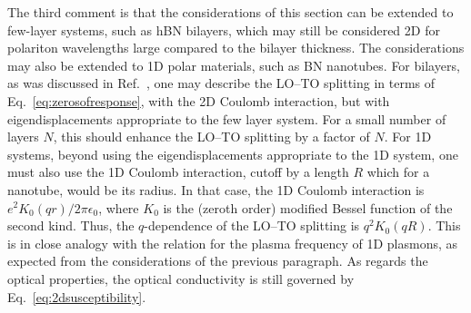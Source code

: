 \documentclass[aps,prb,twocolumn,
	           groupedaddress,superscriptaddress,
               amsfonts,amssymb,amsmath,floatfix,
	           citeautoscript]{revtex4-1}
\begin{document}
The third comment is that the considerations of this section can be extended to few-layer systems, such as hBN bilayers, which may still be considered 2D for polariton wavelengths large compared to the bilayer thickness. The considerations may also be extended to 1D polar materials, such as BN nanotubes. For bilayers, as was discussed in Ref.~, one may describe the LO--TO splitting in terms of Eq.~\eqref{eq:zerosofresponse}, with the 2D Coulomb interaction, but with eigendisplacements appropriate to the few layer system. For a small number of layers $N$, this should enhance the LO--TO splitting by a factor of $N$. For 1D systems, beyond using the eigendisplacements appropriate to the 1D system, one must also use the 1D Coulomb interaction, cutoff by a length $R$ which for a nanotube, would be its radius. In that case, the 1D Coulomb interaction is $e^2K_0(qr)/2\pi\epsilon_0$, where $K_0$ is the (zeroth order) modified Bessel function of the second kind. Thus, the $q$-dependence of the LO--TO splitting is $q^2K_0(qR)$. This is in close analogy with the relation for the plasma frequency of 1D plasmons, as expected from the considerations of the previous paragraph. As regards the optical properties, the optical conductivity is still governed by Eq.~\eqref{eq:2dsusceptibility}.

  
\end{document}
